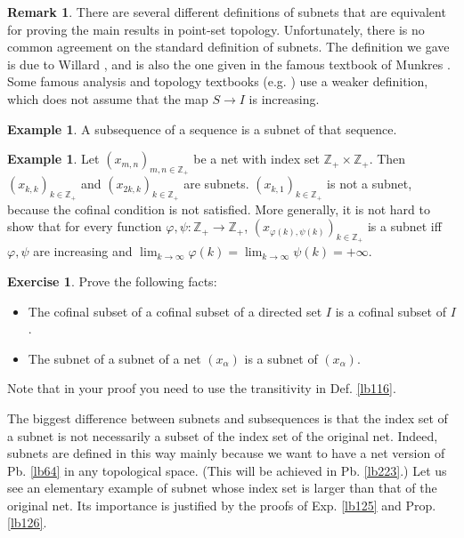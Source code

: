 \documentclass[12pt,b5paper,notitlepage]{article}
\theoremstyle{definition}
\newtheorem{eg}[df]{Example}
\newtheorem{exe}[df]{Exercise}
\newtheorem{rem}[df]{Remark}
\theoremstyle{plain}
\newcommand{\Zbb}{\mathbb Z}
\numberwithin{equation}{section}
\begin{document}
\begin{rem}
There are several different definitions of subnets that are equivalent for proving the main results in point-set topology. Unfortunately, there is no common agreement on the standard definition of subnets. The definition we gave is due to Willard \cite{Wil}, and is also the one given in the famous textbook of Munkres \cite{Mun}. Some famous analysis and topology textbooks (e.g. \cite{Fol,Kel,RS}) use a weaker definition, which does not assume that the map $S\rightarrow I$ is increasing.
\end{rem}




\begin{eg}
A subsequence of a sequence is a subnet of that sequence.
\end{eg}

\begin{eg}\label{lb118}
Let $(x_{m,n})_{m,n\in\Zbb_+}$ be a net with index set $\Zbb_+\times\Zbb_+$. Then $(x_{k,k})_{k\in\Zbb_+}$ and $(x_{2k,k})_{k\in\Zbb_+}$ are subnets. $(x_{k,1})_{k\in\Zbb_+}$ is not a subnet, because the cofinal condition is not satisfied. More generally, it is not hard to show that for every function $\varphi,\psi:\Zbb_+\rightarrow\Zbb_+$, $(x_{\varphi(k),\psi(k)})_{k\in\Zbb_+}$ is a subnet iff $\varphi,\psi$ are increasing and $\lim_{k\rightarrow\infty}\varphi(k)=\lim_{k\rightarrow\infty}\psi(k)=+\infty$.
\end{eg}

\begin{exe}
Prove the following facts:
\begin{itemize}
\item The cofinal subset of a cofinal subset of a directed set $I$ is a cofinal subset of $I$.
\item  The subnet of a subnet of a net $(x_\alpha)$ is a subnet of $(x_\alpha)$. 
\end{itemize}
Note that in your proof you need to use the transitivity in Def. \ref{lb116}.
\end{exe}


The biggest difference between subnets and subsequences is that the index set of a subnet is not necessarily a subset of the index set of the original net. Indeed, subnets are defined in this way mainly because we want to have a net version of Pb. \ref{lb64} in any topological space. (This will be achieved in Pb. \ref{lb223}.) Let us see an elementary example of subnet whose index set is larger than that of the original net. Its importance is justified by the proofs of Exp. \ref{lb125} and Prop. \ref{lb126}.
\end{document}
